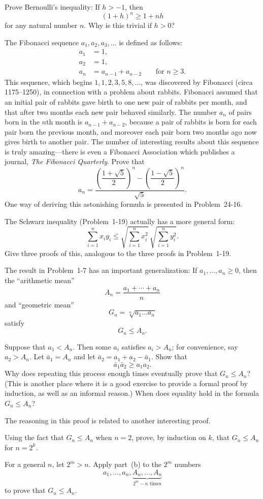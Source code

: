  Prove Bernoulli's inequality: If $h > -1$, then
\[ (1+h)^n \geq 1 + nh \]
for any natural number $n$. Why is this trivial if $h > 0$?

 The Fibonacci sequence $a_1, a_2, a_3, \dots$ is defined as
follows:
\begin{align*}
a_1 &= 1,\\
a_2 &= 1,\\
a_n &= a_{n-1} + a_{n-2} \qquad \text{for } n \geq 3.
\end{align*}
This sequence, which begins $1, 1, 2, 3, 5, 8, \dots$, was discovered by
Fibonacci (circa 1175--1250), in connection with a problem about rabbits.
Fibonacci assumed that an initial pair of rabbits gave birth to one new pair
of rabbits per month, and that after two months each new pair behaved
similarly. The number $a_n$ of pairs born in the $n$th month is
$a_{n-1} + a_{n-2}$, because a pair of rabbits is born for each pair born the
previous month, and moreover each pair born two months ago now gives birth to
another pair. The number of interesting results about this sequence is truly
amazing---there is even a Fibonacci Association which publishes a journal,
\textit{The Fibonacci Quarterly}. Prove that
\[
a_n = \frac{
  \left(\dfrac{1+\sqrt{5}}{2}\right)^{n}
  - \left(\dfrac{1-\sqrt{5}}{2}\right)^{n}
}{\sqrt{5}}.
\]
One way of deriving this astonishing formula is presented in Problem~24-16.

 The Schwarz inequality (Problem~1-19) actually has a more general
form:
\[
\sum_{i=1}^{n} x_i y_i
\leq
\sqrt{\sum_{i=1}^{n} x_i^2}\,
\sqrt{\sum_{i=1}^{n} y_i^2}.
\]
Give three proofs of this, analogous to the three proofs in Problem~1-19.

 The result in Problem~1-7 has an important generalization: If
$a_1, \dots, a_n \geq 0$, then the ``arithmetic mean''
\[ A_n = \frac{a_1 + \cdots + a_n}{n} \]
and ``geometric mean''
\[ G_n = \sqrt[n]{a_1 \ldots a_n} \]
satisfy
\[ G_n \leq A_n. \]

\begin{letters}
\item Suppose that $a_1 < A_n$. Then some $a_i$ satisfies $a_i > A_n$; for
  convenience, say $a_2 > A_n$. Let $\bar{a}_1 = A_n$ and let
  $\bar{a}_2 = a_1 + a_2 - \bar{a}_1$. Show that
\[ \bar{a}_1 \bar{a}_2 \geq a_1 a_2. \]
Why does repeating this process enough times eventually prove that
$G_n \leq A_n$? (This is another place where it is a good exercise to provide
a formal proof by induction, as well as an informal reason.) When does
equality hold in the formula $G_n \leq A_n$?

The reasoning in this proof is related to another interesting proof.

\item Using the fact that $G_n \leq A_n$ when $n = 2$, prove, by induction on
  $k$, that $G_n \leq A_n$ for $n = 2^k$.
\item For a general $n$, let $2^m > n$. Apply part~(b) to the $2^m$ numbers
\[ a_1, \dots, a_n, \underbrace{A_n, \dots, A_n}_{2^m - n \text{ times}} \]
to prove that $G_n \leq A_n$.
\end{letters}

